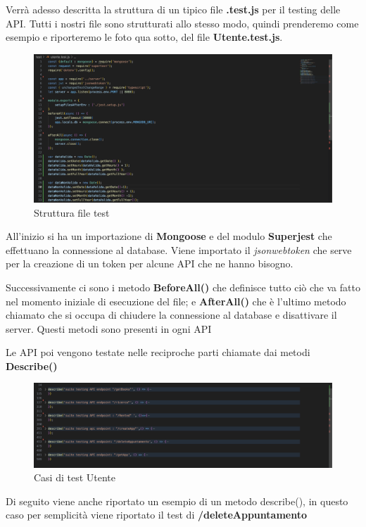 \documentclass{article}
\begin{document}
Verrà adesso descritta la struttura di un tipico file \textbf{.test.js} per il testing delle API. Tutti i nostri file sono strutturati allo stesso modo, quindi prenderemo come esempio e riporteremo le foto qua sotto, del file \textbf{Utente.test.js}.
\begin{figure}[H]
    \centering
    \includegraphics[width=130mm]{D4/Images/Struttturatest.png}
    \caption{Struttura file test}
    \label{fig:enter-label}
\end{figure}
All'inizio si ha un importazione di \textbf{Mongoose} e del modulo \textbf{Superjest} che effettuano la connessione al database. Viene importato il \textit{jsonwebtoken} che serve per la creazione di un token per alcune API che ne hanno bisogno.

Successivamente ci sono i metodo \textbf{BeforeAll()} che definisce tutto ciò che va fatto nel momento iniziale di esecuzione del file; e \textbf{AfterAll()} che è l'ultimo metodo chiamato che si occupa di chiudere  la connessione al database e disattivare il server.
Questi metodi sono presenti in ogni API

Le API poi vengono testate nelle reciproche parti chiamate dai metodi \textbf{Describe()}

\begin{figure}[H]
    \centering
    \includegraphics[width=130mm]{D4/Images/CasiTest.png}
    \caption{Casi di test Utente}
\end{figure}

Di seguito viene anche riportato un esempio di un metodo describe(),
in questo caso per semplicità viene riportato il test di \textbf{/deleteAppuntamento}
\end{document}
